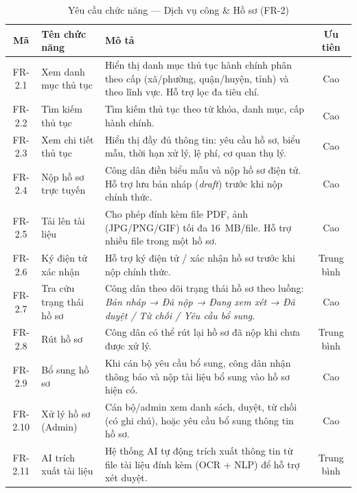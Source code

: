 \begin{table}[H]
\centering
\caption{Yêu cầu chức năng — Dịch vụ công \& Hồ sơ (FR-2)}
\label{tab:fr-services}
\begin{tabularx}{\textwidth}{|c|l|X|c|}
\hline
\textbf{Mã} & \textbf{Tên chức năng} & \textbf{Mô tả} & \textbf{Ưu tiên} \\
\hline
FR-2.1 & Xem danh mục thủ tục &
  Hiển thị danh mục thủ tục hành chính phân theo cấp (xã/phường, quận/huyện,
  tỉnh) và theo lĩnh vực. Hỗ trợ lọc đa tiêu chí. &
  Cao \\
\hline
FR-2.2 & Tìm kiếm thủ tục &
  Tìm kiếm thủ tục theo từ khóa, danh mục, cấp hành chính. &
  Cao \\
\hline
FR-2.3 & Xem chi tiết thủ tục &
  Hiển thị đầy đủ thông tin: yêu cầu hồ sơ, biểu mẫu, thời hạn xử lý,
  lệ phí, cơ quan thụ lý. &
  Cao \\
\hline
FR-2.4 & Nộp hồ sơ trực tuyến &
  Công dân điền biểu mẫu và nộp hồ sơ điện tử. Hỗ trợ lưu bản nháp
  (\textit{draft}) trước khi nộp chính thức. &
  Cao \\
\hline
FR-2.5 & Tải lên tài liệu &
  Cho phép đính kèm file PDF, ảnh (JPG/PNG/GIF) tối đa 16~MB/file.
  Hỗ trợ nhiều file trong một hồ sơ. &
  Cao \\
\hline
FR-2.6 & Ký điện tử xác nhận &
  Hỗ trợ ký điện tử / xác nhận hồ sơ trước khi nộp chính thức. &
  Trung bình \\
\hline
FR-2.7 & Tra cứu trạng thái hồ sơ &
  Công dân theo dõi trạng thái hồ sơ theo luồng: \textit{Bản nháp → Đã nộp
  → Đang xem xét → Đã duyệt / Từ chối / Yêu cầu bổ sung}. &
  Cao \\
\hline
FR-2.8 & Rút hồ sơ &
  Công dân có thể rút lại hồ sơ đã nộp khi chưa được xử lý. &
  Trung bình \\
\hline
FR-2.9 & Bổ sung hồ sơ &
  Khi cán bộ yêu cầu bổ sung, công dân nhận thông báo và nộp
  tài liệu bổ sung vào hồ sơ hiện có. &
  Cao \\
\hline
FR-2.10 & Xử lý hồ sơ (Admin) &
  Cán bộ/admin xem danh sách, duyệt, từ chối (có ghi chú), hoặc
  yêu cầu bổ sung thông tin hồ sơ. &
  Cao \\
\hline
FR-2.11 & AI trích xuất tài liệu &
  Hệ thống AI tự động trích xuất thông tin từ file tài liệu đính kèm
  (OCR + NLP) để hỗ trợ xét duyệt. &
  Trung bình \\
\hline
\end{tabularx}
\end{table}

